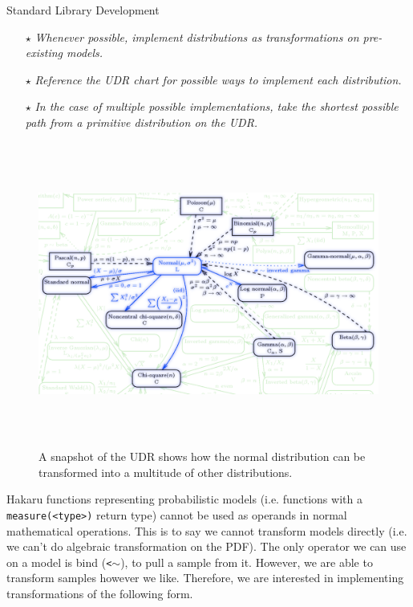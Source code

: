 \documentclass[22pt]{beamer}
\begin{document}
\begin{frame}[fragile]
\begin{textblock}{5}
\begin{textblock}{5}
\begin{block}{Standard Library Development}
{\tiny{


\begin{itemize}
  \item[\textbf{$\star$}] \textit{Whenever possible, implement distributions as transformations on pre-existing models. }
  \item[\textbf{$\star$}] \textit{Reference the UDR chart for possible ways to implement each distribution. }
  \item[\textbf{$\star$}] \textit{In the case of multiple possible implementations, take the shortest possible path from a primitive distribution on the UDR. }
\end{itemize}
        }
}

\bigskip

\begin{figure}
\centering
\includegraphics[height=10cm]{UDR.png}
\caption{\tiny{A snapshot of the UDR shows how the normal distribution can be transformed into a multitude of other distributions.}}
\end{figure}

\tiny{Hakaru functions representing probabilistic models (i.e. functions with a {\tt \tiny{measure(<type>)}} return type) cannot be used as operands in normal mathematical operations. This is to say we cannot transform models directly (i.e. we can’t do algebraic transformation on the PDF). The only operator we can use on a model is bind ({\tt \tiny{<$\sim$}}), to pull a sample from it. However, we are able to transform samples however we like. Therefore, we are interested in implementing transformations of the following form.}


\end{block}
\end{textblock}
\end{textblock}
\end{frame}
\end{document}
